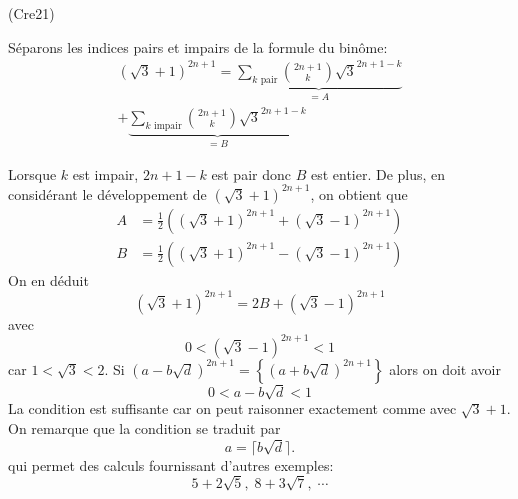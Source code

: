 \begin{tiny}(Cre21)\end{tiny} Séparons les indices pairs et impairs de la formule du binôme:
\begin{multline*}
 (\sqrt{3}+1)^{2n+1}= \underset{= A}{\underbrace{\sum_{k \text{ pair}}\binom{2n+1}{k}\sqrt{3}^{2n+1-k}}}\\
 + \underset{= B}{\underbrace{\sum_{k \text{ impair}}\binom{2n+1}{k}\sqrt{3}^{2n+1-k}}}
\end{multline*}

Lorsque $k$ est impair, $2n+1-k$ est pair donc $B$ est entier. De plus, en considérant le développement de $(\sqrt{3}+1)^{2n+1}$, on obtient que 
\begin{align*}
 A &= \frac{1}{2}\left((\sqrt{3}+1)^{2n+1} + (\sqrt{3}-1)^{2n+1} \right) \\
 B &= \frac{1}{2}\left((\sqrt{3}+1)^{2n+1} - (\sqrt{3}-1)^{2n+1} \right)
\end{align*}
On en déduit
\begin{displaymath}
 (\sqrt{3}+1)^{2n+1}= 2B + (\sqrt{3}-1)^{2n+1}
\end{displaymath}
avec 
\begin{displaymath}
 0 < (\sqrt{3}-1)^{2n+1} < 1
\end{displaymath}
car $1< \sqrt{3} < 2$.\newline
Si $(a-b\sqrt{d})^{2n+1} = \left\lbrace (a+b\sqrt{d})^{2n+1} \right\rbrace $ alors on doit avoir
\[
 0 < a-b\sqrt{d} <1
\]
La condition est suffisante car on peut raisonner exactement comme avec $\sqrt{3}+1$. On remarque que la condition se traduit par 
\[
 a = \lceil b\sqrt{d} \rceil.
\]
qui permet des calculs fournissant d'autres exemples:
\[
 5+2\sqrt{5}, \;8+3\sqrt{7}, \; \cdots
\]
